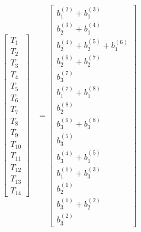\documentclass[10pt]{article}
\begin{document}
\begin{landscape}
{\begin{align*}
\left[\begin{matrix}T_{1}\\T_{2}\\T_{3}\\T_{4}\\T_{5}\\T_{6}\\T_{7}\\T_{8}\\T_{9}\\T_{10}\\T_{11}\\T_{12}\\T_{13}\\T_{14}\end{matrix}\right] &= \left[\begin{matrix}b^{(2)}_{1} + b^{(3)}_{1}\\b^{(3)}_{2} + b^{(4)}_{1}\\b^{(4)}_{2} + b^{(5)}_{2} + b^{(6)}_{1}\\b^{(6)}_{2} + b^{(7)}_{2}\\b^{(7)}_{3}\\b^{(7)}_{1} + b^{(8)}_{1}\\b^{(8)}_{2}\\b^{(6)}_{3} + b^{(8)}_{3}\\b^{(5)}_{3}\\b^{(4)}_{3} + b^{(5)}_{1}\\b^{(1)}_{1} + b^{(3)}_{3}\\b^{(1)}_{2}\\b^{(1)}_{3} + b^{(2)}_{2}\\b^{(2)}_{3}\end{matrix}\right] \\

\end{align*}}
\end{landscape}
\end{document}
